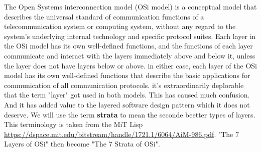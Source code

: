 \documentclass[a4paper,twoside]{article}
\numberwithin{equation}{section}
\begin{document}
The Open Systems interconnection model (OSi model) is a conceptual model that describes the universal
standard of communication functions of a telecommunication system or computing system, without any
regard to the system's underlying internal technology and specific protocol suites.
Each layer in the OSi model has its own well-defined functions, and the functions of
each layer communicate and interact with the layers immediately above and below it, unless
the layer does not have layers below or above. in either case, each layer of the OSi model
has its own well-defined functions that describe the basic applications for communication of all
communication protocols. it's extraordinarily deplorable that the term "layer" got used in both models. This has caused much
confusion. And it has added value to the layered software design pattern which it does not deserve. \newline
We will use the term \textbf{strata} to mean the seconde beetter types of layers. This terminology
is taken from the MiT Lisp \href{paper}{https://dspace.mit.edu/bitstream/handle/1721.1/6064/AiM-986.pdf}.
"The 7 Layers of OSi" then become "The 7 Strata of OSi".
\end{document}
